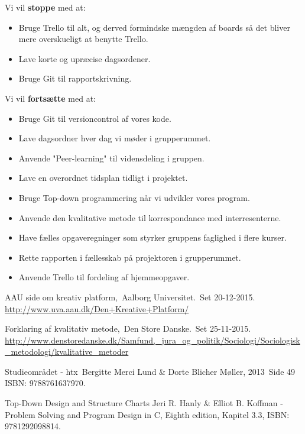 \documentclass[oneside,a4paper,titlepage]{article}
\begin{document}
Vi vil \textbf{stoppe} med at:
\begin{itemize}
  \item Bruge Trello til alt, og derved formindske mængden af boards så det bliver mere overskueligt at benytte Trello.
  \item Lave korte og upræcise dagsordener.
  \item Bruge Git til rapportskrivning.
\end{itemize}

Vi vil \textbf{fortsætte} med at:
\begin{itemize}
  \item Bruge Git til versioncontrol af vores kode.
  \item Lave dagsordner hver dag vi møder i grupperummet.
  \item Anvende "Peer-learning" til vidensdeling i gruppen. 
  \item Lave en overordnet tidsplan tidligt i projektet. 
  \item Bruge Top-down programmering når vi udvikler vores program.
  \item Anvende den kvalitative metode til korrespondance med interresenterne. 
  \item Have fælles opgaveregninger som styrker gruppens faglighed i flere kurser.
  \item Rette rapporten i fællesskab på projektoren i grupperummet.
  \item Anvende Trello til fordeling af hjemmeopgaver.
\end{itemize}

\begin{thebibliography}{99}
  AAU side om kreativ platform,\
  Aalborg Universitet.\
  Set 20-12-2015.\\
  \url{http://www.uva.aau.dk/Den+Kreative+Platform/}

  Forklaring af kvalitativ metode,\
  Den Store Danske.\
  Set 25-11-2015.\\
  \url{http://www.denstoredanske.dk/Samfund,_jura_og_politik/Sociologi/Sociologisk_metodologi/kvalitative_metoder}

\bibitem{SO_bog}  
  Studieområdet - htx\
  Bergitte Merci Lund \& Dorte Blicher Møller, 2013\
  Side 49\\
  ISBN: 9788761637970.

  Top-Down Design and Structure Charts
  Jeri R. Hanly \& Elliot B. Koffman - Problem Solving and Program Design in C, Eighth edition, Kapitel 3.3,
  ISBN: 9781292098814.
  
\end{thebibliography}
\clearpage
\end{document}
